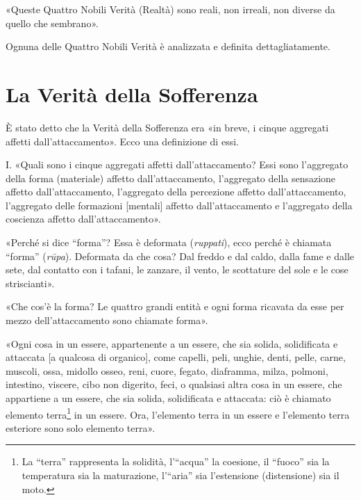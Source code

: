 
«Queste Quattro Nobili Verità (Realtà) sono reali, non irreali, non diverse da
quello che sembrano».


 Ognuna delle Quattro Nobili Verità è analizzata e
definita dettagliatamente.

\section*{La Verità della Sofferenza}

 È stato detto che la Verità della Sofferenza era
«in breve, i cinque aggregati affetti dall’attaccamento». Ecco una definizione
di essi.

 I. «Quali sono i cinque aggregati affetti dall’attaccamento?
Essi sono l’aggregato della forma (materiale) affetto dall’attaccamento,
l’aggregato della sensazione affetto dall’attaccamento, l’aggregato della
percezione affetto dall’attaccamento, l’aggregato delle formazioni [mentali]
affetto dall’attaccamento e l’aggregato della coscienza affetto
dall’attaccamento».


«Perché si dice “forma”? Essa è deformata (\emph{ruppati}), ecco perché è
chiamata “forma” (\emph{rūpa}). Deformata da che cosa? Dal freddo e dal caldo,
dalla fame e dalle sete, dal contatto con i tafani, le zanzare, il vento, le
scottature del sole e le cose striscianti».


«Che cos’è la forma? Le quattro grandi entità e ogni forma ricavata da esse per
mezzo dell’attaccamento sono chiamate forma».


«Ogni cosa in un essere, appartenente a un essere, che sia solida, solidificata
e attaccata [a qualcosa di organico], come capelli, peli, unghie, denti, pelle,
carne, muscoli, ossa, midollo osseo, reni, cuore, fegato, diaframma, milza,
polmoni, intestino, viscere, cibo non digerito, feci, o qualsiasi altra cosa in
un essere, che appartiene a un essere, che sia solida, solidificata e attaccata:
ciò è chiamato elemento terra\footnote{La “terra” rappresenta la solidità,
  l’“acqua” la coesione, il “fuoco” sia la temperatura sia la maturazione,
  l’“aria” sia l’estensione (distensione) sia il moto.} in un essere. Ora,
l’elemento terra in un essere e l’elemento terra esteriore sono solo elemento
terra».

